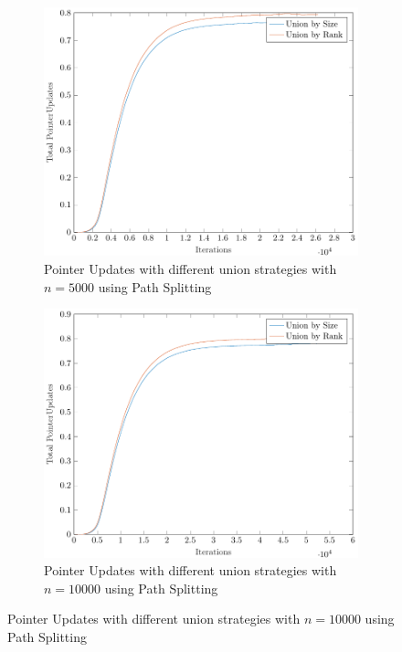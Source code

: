 \begin{figure}[ht]
\begin{subfigure}{0.32\textwidth}
    \end{subfigure}%
    \hfill
    \begin{subfigure}{0.32\textwidth}
        \centering
        \includegraphics[width=\textwidth]{../images/plotPSNonFull5000_PointerUpdates.pdf}
        \caption{Pointer Updates with different union strategies with $n = 5000$ using Path Splitting}
    \end{subfigure}%
    \hfill
    \begin{subfigure}{0.32\textwidth}
        \centering
        \includegraphics[width=\textwidth]{../images/plotPSNonFull10000_PointerUpdates.pdf}
        \caption{Pointer Updates with different union strategies with $n = 10000$ using Path Splitting}
    \end{subfigure}


\end{figure}
